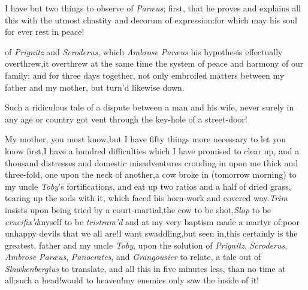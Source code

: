 \documentclass{article}
\begin{document}
I have but two things to observe of \textit{Paræus}; first, that
he proves and ex\-plains all this with the utmost chastity and\break
decorum of expression:\tsk for which may his soul for ever rest
in peace!

\noindent
{} 
of \textit{Prignitz} and \textit{Scroderus}, which
\textit{Ambrose} \textit{Paræus} his
hypothesis effectually overthrew,\tsk it overthrew at the same
time the system of peace and harmony of our family; and for
three days together, not only embroiled matters between my
father and my mother, but turn’d likewise \break {} down.

Such a ridiculous tale of a dispute between a man and his wife,
never surely in any age or country got vent through the key-hole of
a street-door!

My mother, you must know,\tsh but I have fifty
things more necessary to let you know first,\tsk I have a hundred
difficulties which I have promised to clear up, and a thousand
distresses and domestic misadventures crouding in upon me thick
and three-fold, one upon the neck of another,\tsh a cow broke in
(tomorrow morning) to my uncle \textit{Toby}’s fortifications,
and eat up two ratios and a half of dried grass, tearing up the
sods with\break
it, which faced his horn-work and covered
way.\tsk \textit{Trim} insists upon being tried by a
court-martial,\tsk the cow to be shot,\break\tsk \textit{Slop} to be
\textit{crucifix’d}\tsk myself to be \textit{tris\-tram’d}
and at my very baptism made a martyr of;\tsh poor unhappy
devils that we all are!\tsk I want
swaddling,\tsh but\break
{}
seen in,\tsk this certainly is the greatest,
father and my
uncle \textit{Toby}, upon the solution of \textit{Prignitz}, \textit{Scroderus},
\textit{Ambrose Pa\-ræus}, \textit{Panocrates}, and \textit{Grangousier} to
relate,\tsk
a tale out of \textit{Slawkenbergius} to translate, and
all this in five minutes less, than no time at
all;\tsh such a head!\tsk would to heaven!\@ my enemies
only saw the inside of it!
\end{document}
